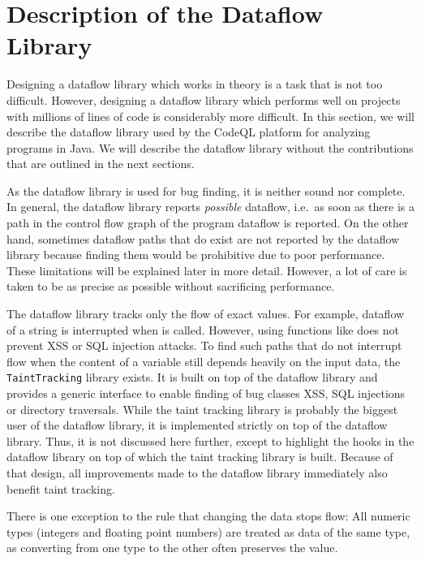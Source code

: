 \section{Description of the Dataflow Library}
Designing a dataflow library which works in theory is a task that is not too difficult.
However, designing a dataflow library which performs well on projects with millions of lines of code is 
considerably more difficult.
In this section, we will describe the dataflow library used by the CodeQL platform %
for analyzing programs in Java.
We will describe the dataflow library without the contributions that are outlined in the next sections.

As the dataflow library is used for bug finding, it is neither sound nor complete.
In general, the dataflow library reports \emph{possible} dataflow, i.e.\ as soon
as there is a path in the control flow graph of the program dataflow is reported.
On the other hand, sometimes dataflow paths that do exist are not reported by the 
dataflow library because finding them would be prohibitive due to poor performance.
These limitations will be explained later in more detail.
However, a lot of care is taken to be as precise as possible 
without sacrificing performance. 

The dataflow library tracks only the flow of exact values.
For example, dataflow of a string is interrupted when  is called.
However, using functions like  does not prevent XSS or SQL injection attacks.
To find such paths that do not interrupt flow when the content of a variable still depends 
heavily on the input data, the \texttt{TaintTracking} library exists.
It is built on top of the dataflow library and provides a generic interface to enable
finding of bug classes XSS, SQL injections or directory traversals.
While the taint tracking library is probably the biggest user of the dataflow library,
it is implemented strictly on top of the dataflow library.
Thus, it is not discussed here further, except to highlight the hooks in the dataflow 
library on top of which the taint tracking library is built.
Because of that design, all improvements made to the dataflow library immediately
also benefit taint tracking.

There is one exception to the rule that changing the data stops flow: All numeric types 
(integers and floating point numbers) are treated as data of the same type,
as converting from one type to the other often preserves the value.


